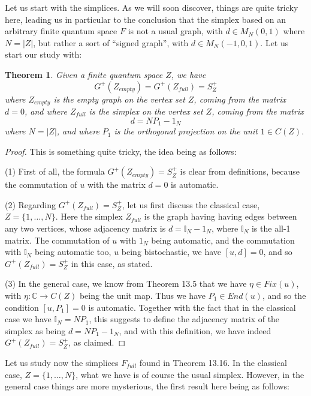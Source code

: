 \documentclass[12pt]{amsbook}
\newtheorem{theorem}{Theorem}[chapter]
\begin{document}
\bigskip

Let us start with the simplices. As we will soon discover, things are quite tricky here, leading us in particular to the conclusion that the simplex based on an arbitrary finite quantum space $F$ is not a usual graph, with $d\in M_N(0,1)$ where $N=|Z|$, but rather a sort of ``signed graph'', with $d\in M_N(-1,0,1)$. Let us start our study with:

\begin{theorem}
Given a finite quantum space $Z$, we have
$$G^+(Z_{empty})=G^+(Z_{full})=S_Z^+$$
where $Z_{empty}$ is the empty graph on the vertex set $Z$, coming from the matrix $d=0$, and where $Z_{full}$ is the simplex on the vertex set $Z$, coming from the matrix 
$$d=NP_1-1_N$$
where $N=|Z|$, and where $P_1$ is the orthogonal projection on the unit $1\in C(Z)$.
\end{theorem}

\begin{proof}
This is something quite tricky, the idea being as follows:

\medskip

(1) First of all, the formula $G^+(Z_{empty})=S_Z^+$ is clear from definitions, because the commutation of $u$ with the matrix $d=0$ is automatic.

\medskip

(2) Regarding $G^+(Z_{full})=S_Z^+$, let us first discuss the classical case, $Z=\{1,\ldots,N\}$. Here the simplex $Z_{full}$ is the graph having having edges between any two vertices, whose adjacency matrix is $d=\mathbb I_N-1_N$, where $\mathbb I_N$ is the all-1 matrix. The commutation of $u$ with $1_N$ being automatic, and the commutation with $\mathbb I_N$ being automatic too, $u$ being bistochastic, we have $[u,d]=0$, and so $G^+(Z_{full})=S_Z^+$ in this case, as stated.

\medskip

(3) In the general case, we know from Theorem 13.5 that we have $\eta\in Fix(u)$, with $\eta:\mathbb C\to C(Z)$ being the unit map. Thus we have $P_1\in End(u)$, and so the condition $[u,P_1]=0$ is automatic. Together with the fact that in the classical case we have $\mathbb I_N=NP_1$, this suggests to define the adjacency matrix of the simplex as being $d=NP_1-1_N$, and with this definition, we have indeed $G^+(Z_{full})=S_Z^+$, as claimed.
\end{proof}

Let us study now the simplices $F_{full}$ found in Theorem 13.16. In the classical case, $Z=\{1,\ldots,N\}$, what we have is of course the usual simplex. However, in the general case things are more mysterious, the first result here being as follows:
\end{document}
